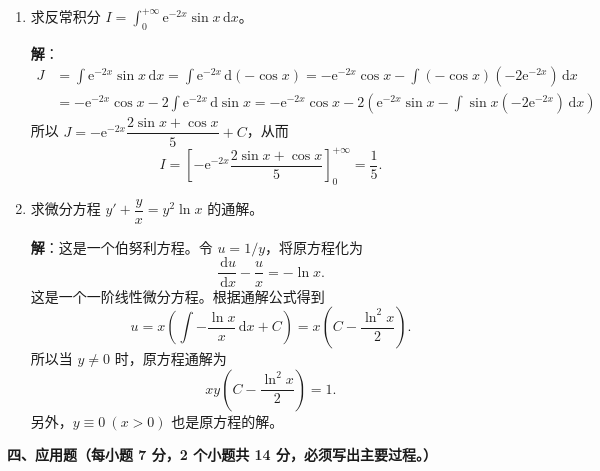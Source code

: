\documentclass[a4paper,11pt]{ctexart}
\newcommand{\dd}{\,\mathrm{d}}
\newcommand{\e}{\mathrm{e}}
\begin{document}
\begin{enumerate}[label=\arabic*., start=11, leftmargin=2em, itemsep=1.0em, topsep=0.6em]
  \item 求反常积分 $I=\displaystyle\int_0^{+\infty}\e^{-2x}\sin x\dd x$。

  \textbf{解}：
  \begin{align*}
    J &= \int\e^{-2x}\sin x\dd x = \int\e^{-2x}\dd(-\cos x) = -\e^{-2x}\cos x - \int(-\cos x)(-2\e^{-2x})\dd x \\
      &= -\e^{-2x}\cos x - 2\int\e^{-2x}\dd\sin x = -\e^{-2x}\cos x - 2\left(\e^{-2x}\sin x - \int\sin x(-2\e^{-2x})\dd x\right) \tag*{（4 分）}
  \end{align*}
  所以 $J=-\e^{-2x}\dfrac{2\sin x+\cos x}{5}+C$，从而
  \[
    I = \left[-\e^{-2x}\frac{2\sin x+\cos x}{5}\right]_0^{+\infty} = \frac{1}{5}. \tag*{（7 分）}
  \]

  \item 求微分方程 $y'+\dfrac{y}{x}=y^2\ln x$ 的通解。

  \textbf{解}：这是一个伯努利方程。令 $u=1/y$，将原方程化为
  \[
    \frac{\dd u}{\dd x} - \frac{u}{x} = -\ln x. \tag*{（2 分）}
  \]
  这是一个一阶线性微分方程。根据通解公式得到
  \[
    u = x\left(\int -\frac{\ln x}{x}\dd x + C\right) = x\left(C - \frac{\ln^2 x}{2}\right). \tag*{（6 分）}
  \]
  所以当 $y\neq 0$ 时，原方程通解为
  \[
    xy\left(C - \frac{\ln^2 x}{2}\right) = 1. \tag*{（7 分）}
  \]
  另外，$y\equiv 0\ (x>0)$ 也是原方程的解。
\end{enumerate}

\vspace{0.8em}

\textbf{四、应用题（每小题 7 分，2 个小题共 14 分，必须写出主要过程。）}
\end{document}
